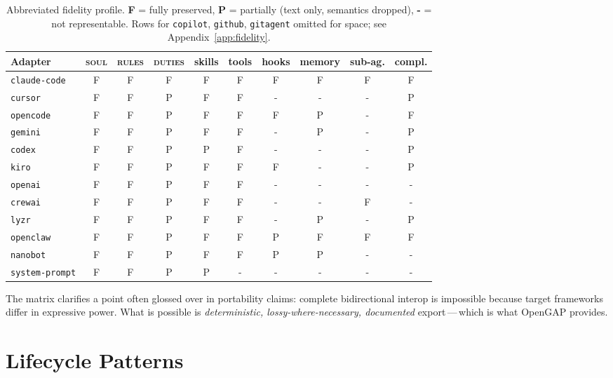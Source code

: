 \documentclass[11pt,a4paper]{article}
\begin{document}
\begin{table}[h]
\centering
\footnotesize
\begin{tabular}{@{}lccccccccc@{}}
\toprule
Adapter & \textsc{soul} & \textsc{rules} & \textsc{duties} & skills & tools & hooks & memory & sub-ag. & compl. \\
\midrule
\texttt{claude-code}   & F & F & F & F & F & F & F & F & F \\
\texttt{cursor}        & F & F & P & F & F & - & - & - & P \\
\texttt{opencode}      & F & F & P & F & F & F & P & - & F \\
\texttt{gemini}        & F & F & P & F & F & - & P & - & P \\
\texttt{codex}         & F & F & P & P & F & - & - & - & P \\
\texttt{kiro}          & F & F & P & F & F & F & - & - & P \\
\texttt{openai}        & F & F & P & F & F & - & - & - & - \\
\texttt{crewai}        & F & F & P & F & F & - & - & F & - \\
\texttt{lyzr}          & F & F & P & F & F & - & P & - & P \\
\texttt{openclaw}      & F & F & P & F & F & P & F & F & F \\
\texttt{nanobot}       & F & F & P & F & F & P & P & - & - \\
\texttt{system-prompt} & F & F & P & P & - & - & - & - & - \\
\bottomrule
\end{tabular}
\caption{Abbreviated fidelity profile. \textbf{F} = fully preserved, \textbf{P} =
partially (text only, semantics dropped), \textbf{-} = not representable. Rows for
\texttt{copilot}, \texttt{github}, \texttt{gitagent} omitted for space; see
Appendix~\ref{app:fidelity}.}
\label{tab:fidelity}
\end{table}

The matrix clarifies a point often glossed over in portability claims: complete
bidirectional interop is impossible because target frameworks differ in expressive
power. What is possible is \emph{deterministic, lossy-where-necessary, documented}
export\,---\,which is what OpenGAP provides.

\section{Lifecycle Patterns}\label{sec:patterns}
\end{document}
